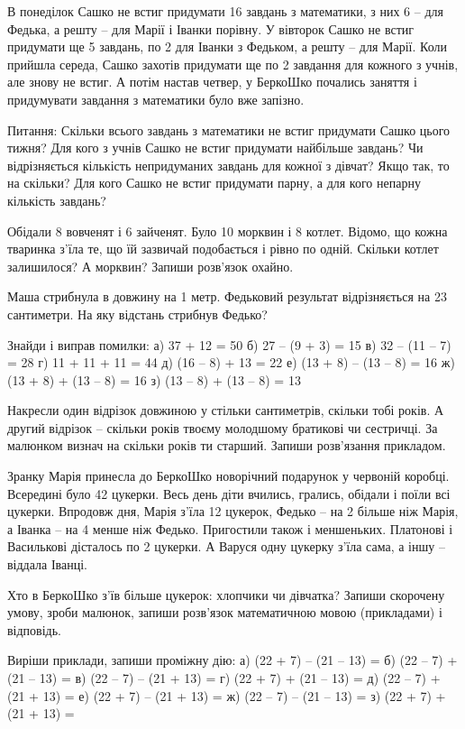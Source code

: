 \problem
В понеділок Сашко не встиг придумати 16 завдань з математики,
з них 6 – для Федька, а решту – для Марії і Іванки порівну. 
У вівторок Сашко не встиг придумати ще 5 завдань,
по 2 для Іванки з Федьком, а решту – для Марії. 
Коли прийшла середа, Сашко захотів придумати
ще по 2 завдання для кожного з учнів, але знову не встиг. 
А потім настав четвер, у БеркоШко почались заняття
і придумувати завдання з математики було вже запізно.

Питання:
Скільки всього завдань з математики не встиг придумати Сашко цього тижня?
Для кого з учнів Сашко не встиг придумати найбільше завдань?
Чи відрізняється кількість непридуманих завдань для кожної з дівчат?
Якщо так, то на скільки?
Для кого Сашко не встиг придумати парну, а для кого непарну кількість завдань?


\problem
Обідали 8 вовченят і 6 зайченят. Було 10 морквин і 8 котлет.
Відомо, що кожна тваринка з'їла те, що їй зазвичай подобається
і рівно по одній.
Скільки котлет залишилося? А морквин? Запиши розв'язок охайно.


\problem
Маша стрибнула в довжину на 1 метр.
Федьковий результат відрізняється на 23 сантиметри.
На яку відстань стрибнув Федько?


\problem
Знайди і виправ помилки:
а) 37 + 12 = 50
б) 27 – (9 + 3) = 15
в) 32 – (11 – 7) = 28
г) 11 + 11 + 11 = 44
д) (16 – 8) + 13 = 22
е) (13 + 8) – (13 – 8) = 16
ж) (13 + 8) + (13 – 8) = 16
з) (13 – 8) + (13 – 8) = 13


\problem
Накресли один відрізок довжиною у стільки сантиметрів, скільки тобі років.
А другий відрізок – скільки років твоєму молодшому братикові чи сестричці.
За малюнком визнач на скільки років ти старший.
Запиши розв’язання прикладом.


\problem
Зранку Марія принесла до БеркоШко новорічний подарунок у червоній коробці.
Всередині було 42 цукерки.
Весь день діти вчились, грались, обідали і поїли всі цукерки.
Впродовж дня, Марія з’їла 12 цукерок, Федько – на 2 більше ніж Марія,
а Іванка – на 4 менше ніж Федько.
Пригостили також і меншеньких. Платонові і Василькові дісталось по 2 цукерки.
А Варуся одну цукерку з’їла сама, а іншу – віддала Іванці.

Хто в БеркоШко з’їв більше цукерок: хлопчики чи дівчатка?
Запиши скорочену умову, зроби малюнок, запиши розв’язок
математичною мовою (прикладами) і відповідь.


\problem
Виріши приклади, запиши проміжну дію:
а) (22 + 7) – (21 – 13) = 
б) (22 – 7) + (21 – 13) = 
в) (22 – 7) – (21 + 13) = 
г) (22 + 7) + (21 – 13) = 
д) (22 – 7) + (21 + 13) = 
е) (22 + 7) – (21 + 13) = 
ж) (22 – 7) – (21 – 13) = 
з) (22 + 7) + (21 + 13) = 


